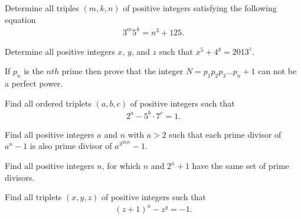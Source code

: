 \documentclass{subfile}
\begin{document}
	\begin{problem} %
		Determine all triples $(m,k,n)$ of positive integers satisfying the following equation
			\begin{align*}
				3^m5^k=n^3+125.
			\end{align*}
	\end{problem}
	
	\begin{problem}[Balkan 2013] %
		Determine all positive integers $x$, $y$, and $z$ such that $x^5 + 4^y = 2013^z$.
	\end{problem}

	\begin{problem} %
		If $p_n$ is the $nth$ prime then prove that the integer $N = p_1p_2p_3 \dots p_n + 1$ can not be a perfect power.
	\end{problem}

	\begin{problem} %
		Find all ordered triplets $(a,b,c)$ of positive integers such that
			\begin{align*}
				2^a-5^{b}\cdot 7^{c} = 1.
			\end{align*}
	\end{problem}

	\begin{problem} %
		Find all positive integers $a$ and $n$ with $a>2$ such that each prime divisor of $a^n-1$ is also prime divisor of $a^{3^{2016}}-1$.
	\end{problem}
	
	\begin{problem} %
		Find all positive integers $n$, for which $n$ and $2^n + 1$ have the same set of prime divisors.
	\end{problem}

	\begin{problem} %
		Find all triplets $ (x,y,z)$ of positive integers such that
			\begin{align*}
				(z+1)^x-z^y=-1.
			\end{align*}
	\end{problem}	
\end{document}
